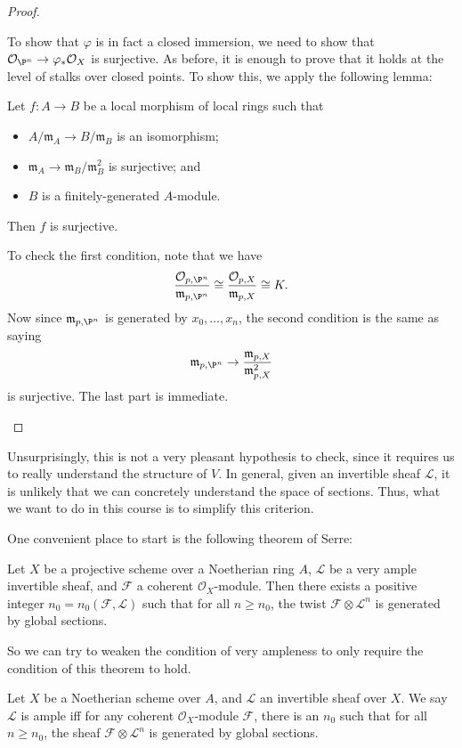 \documentclass[a4paper]{article}
\begin{document}
\begin{proof}
\begin{itemize}
      To show that $\varphi$ is in fact a closed immersion, we need to show that $\mathcal{O}_{\P^n} \to \varphi_* \mathcal{O}_X$ is surjective. As before, it is enough to prove that it holds at the level of stalks over closed points. To show this, we apply the following lemma:
      \begin{lemma}
        Let $f: A \to B$ be a local morphism of local rings such that
        \begin{itemize}
          \item $A/\mathfrak{m}_A \to B/\mathfrak{m}_B$ is an isomorphism;
          \item $\mathfrak{m}_A \to \mathfrak{m}_B/\mathfrak{m}_B^2$ is surjective; and
          \item $B$ is a finitely-generated $A$-module.
        \end{itemize}
        Then $f$ is surjective.\fakeqed
      \end{lemma}
      To check the first condition, note that we have
      \[
        \frac{\mathcal{O}_{p, \P^n}}{\mathfrak{m}_{p, \P^n}} \cong \frac{\mathcal{O}_{p, X}}{\mathfrak{m}_{p, X}} \cong K.
      \]
      Now since $\mathfrak{m}_{p, \P^n}$ is generated by $x_0, \ldots, x_n$, the second condition is the same as saying
      \[
        \mathfrak{m}_{p, \P^n} \to \frac{\mathfrak{m}_{p, X}}{\mathfrak{m}_{p, X}^2}
      \]
      is surjective. The last part is immediate.\qedhere
  \end{itemize}
\end{proof}
Unsurprisingly, this is not a very pleasant hypothesis to check, since it requires us to really understand the structure of $V$. In general, given an invertible sheaf $\mathcal{L}$, it is unlikely that we can concretely understand the space of sections. Thus, what we want to do in this course is to simplify this criterion.

One convenient place to start is the following theorem of Serre:
\begin{thm}[Serre]
  Let $X$ be a projective scheme over a Noetherian ring $A$, $\mathcal{L}$ be a very ample invertible sheaf, and $\mathcal{F}$ a coherent $\mathcal{O}_X$-module. Then there exists a positive integer $n_0 = n_0(\mathcal{F}, \mathcal{L})$ such that for all $n \geq n_0$, the twist $\mathcal{F} \otimes \mathcal{L}^n$ is generated by global sections.\fakeqed
\end{thm}

So we can try to weaken the condition of very ampleness to only require the condition of this theorem to hold.
\begin{defi}
  Let $X$ be a Noetherian scheme over $A$, and $\mathcal{L}$ an invertible sheaf over $X$. We say $\mathcal{L}$ is ample iff for any coherent $\mathcal{O}_X$-module $\mathcal{F}$, there is an $n_0$ such that for all $n \geq n_0$, the sheaf $\mathcal{F} \otimes \mathcal{L}^n$ is generated by global sections.
\end{defi}
\end{document}
